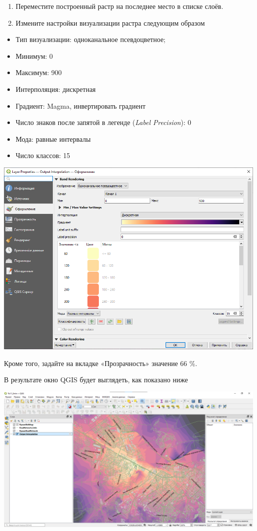 \documentclass[
  12pt,
]{book}
\providecommand{\tightlist}{%
  \setlength{\itemsep}{0pt}\setlength{\parskip}{0pt}}
\begin{document}
\begin{enumerate}
\def\labelenumi{\arabic{enumi}.}
\setcounter{enumi}{6}
\item
  Переместите построенный растр на последнее место в списке слоёв.
\item
  Измените настройки визуализации растра следующим образом
\end{enumerate}

\begin{itemize}
\tightlist
\item
  Тип визуализации: одноканальное псевдоцветное;
\item
  Минимум: 0
\item
  Максимум: 900
\item
  Интерполяция: дискретная
\item
  Градиент: Magma, инвертировать градиент
\item
  Число знаков после запятой в легенде (\emph{Label Precision}): 0
\item
  Мода: равные интервалы
\item
  Число классов: 15
\end{itemize}

\includegraphics{images/Ex11_RoadNetwork/isoarea3.png}

Кроме того, задайте на вкладке «Прозрачность» значение 66 \%.

В результате окно QGIS будет выглядеть, как показано ниже

\includegraphics{images/Ex11_RoadNetwork/isoarea4.png}
\end{document}
